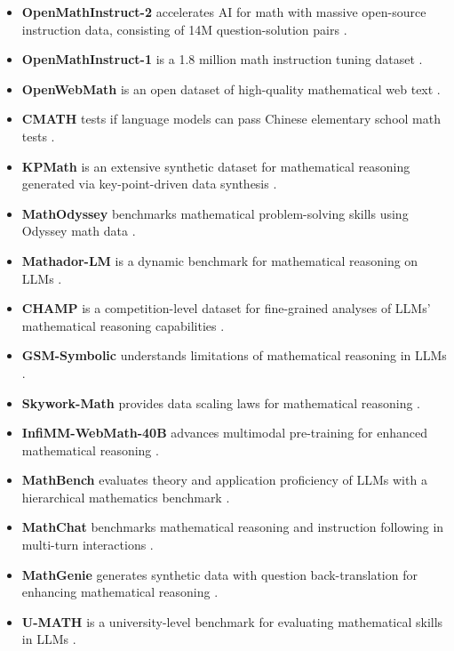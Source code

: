 \documentclass[acmsmall,anonymous]{acmart}
\begin{document}
\begin{itemize}
    \item \textbf{OpenMathInstruct-2} accelerates AI for math with massive open-source instruction data, consisting of 14M question-solution pairs \cite{toshniwal2024a openmathinstruct2}.
    \item \textbf{OpenMathInstruct-1} is a 1.8 million math instruction tuning dataset \cite{toshniwal2024b openmathinstruct1}.
    \item \textbf{OpenWebMath} is an open dataset of high-quality mathematical web text \cite{paster2024openwebmath}.
    \item \textbf{CMATH} tests if language models can pass Chinese elementary school math tests \cite{wei2023cmath}.
    \item \textbf{KPMath} is an extensive synthetic dataset for mathematical reasoning generated via key-point-driven data synthesis \cite{huang2024key}.
    \item \textbf{MathOdyssey} benchmarks mathematical problem-solving skills using Odyssey math data \cite{fang2024}.
    \item \textbf{Mathador-LM} is a dynamic benchmark for mathematical reasoning on LLMs \cite{kurtic2024}.
    \item \textbf{CHAMP} is a competition-level dataset for fine-grained analyses of LLMs' mathematical reasoning capabilities \cite{mao2024}.
    \item \textbf{GSM-Symbolic} understands limitations of mathematical reasoning in LLMs \cite{mirzadeh2024}.
    \item \textbf{Skywork-Math} provides data scaling laws for mathematical reasoning \cite{zeng2024}.
    \item \textbf{InfiMM-WebMath-40B} advances multimodal pre-training for enhanced mathematical reasoning \cite{han2024}.
    \item \textbf{MathBench} evaluates theory and application proficiency of LLMs with a hierarchical mathematics benchmark \cite{liu2024b}.
    \item \textbf{MathChat} benchmarks mathematical reasoning and instruction following in multi-turn interactions \cite{liang2024c}.
    \item \textbf{MathGenie} generates synthetic data with question back-translation for enhancing mathematical reasoning \cite{lu2024b}.
    \item \textbf{U-MATH} is a university-level benchmark for evaluating mathematical skills in LLMs \cite{chernyshev2024}.
\end{itemize}
\end{document}
